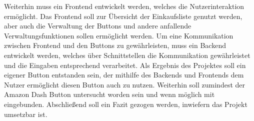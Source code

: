 Weiterhin muss ein Frontend entwickelt werden, welches die Nutzerinteraktion ermöglicht. Das Frontend soll zur Übersicht der Einkaufsliste genutzt werden, aber auch die Verwaltung der Buttons und andere anfallende Verwaltungsfunktionen sollen ermöglicht werden. 
Um eine Kommunikation zwischen Frontend und den Buttons zu gewährleisten, muss ein Backend entwickelt werden, welches über Schnittstellen die Kommunikation gewährleistet und die Eingaben entsprechend verarbeitet. 
Als Ergebnis des Projektes soll ein eigener Button entstanden sein, der mithilfe des Backends und Frontends dem Nutzer ermöglicht diesen Button auch zu nutzen. Weiterhin soll zumindest der Amazon Dash Button untersucht worden sein und wenn möglich mit eingebunden. Abschließend soll ein Fazit gezogen werden, inwiefern das Projekt umsetzbar ist. 